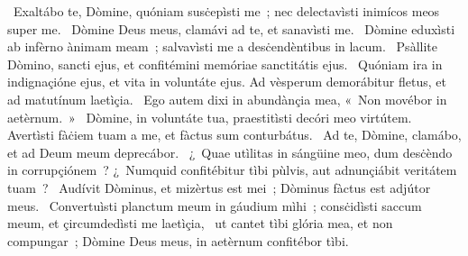 ~Exaltábo te, Dòmine, quóniam susċepìsti me~; nec delectavìsti inimícos meos super me. 
~Dòmine Deus meus, clamávi ad te, et sanavìsti me. 
~Dòmine eduxìsti ab infèrno ànimam meam~; salvavìsti me a desċendèntibus in lacum. 
~Psàllite Dòmino, sancti ejus, et confitémini memóriae sanctitátis ejus. 
~Quóniam ira in indignaçióne ejus, et vita in voluntáte ejus. Ad vèsperum demorábitur fletus, et ad matutínum laetìçia. 
~Ego autem dixi in abundànçia mea, «~Non movébor in aetèrnum.~»
~Dòmine, in voluntáte tua, praestitìsti decóri meo virtútem. Avertìsti fàċiem tuam a me, et fàctus sum conturbátus. 
~Ad te, Dòmine, clamábo, et ad Deum meum deprecábor. 
~¿~Quae utìlitas in sángüine meo, dum desċèndo in corrupçiónem~? ¿~Numquid confitébitur tìbi pùlvis, aut adnunçiábit veritátem tuam~? 
~Audívit Dòminus, et mizèrtus est mei~; Dòminus fàctus est adjútor meus. 
~Convertuìsti planctum meum in gáudium mìhi~; consċidìsti saccum meum, et çircumdedìsti me laetìçia, 
~ut cantet tìbi glória mea, et non compungar~; Dòmine Deus meus, in aetèrnum confitébor tìbi. 
